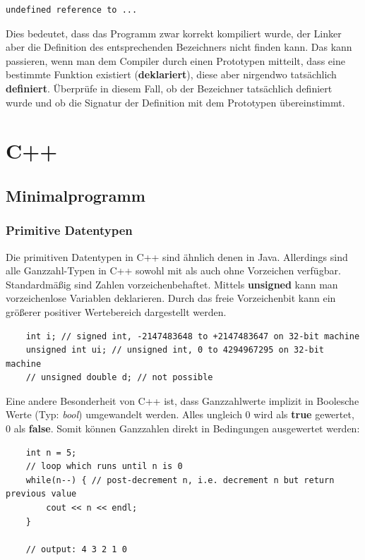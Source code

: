 \documentclass[
  accentcolor=tud1c,	%
  colorbacktitle,		%
  inverttitle,			%
  german,
  twoside
]{tudreport}
\begin{document}
\begin{verbatim}
undefined reference to ...
\end{verbatim}

Dies bedeutet, dass das Programm zwar korrekt kompiliert wurde, der Linker aber die Definition des entsprechenden Bezeichners nicht finden kann.
Das kann passieren, wenn man dem Compiler durch einen Prototypen mitteilt, dass eine bestimmte Funktion existiert (\textbf{deklariert}), diese aber nirgendwo tatsächlich \textbf{definiert}.
Überprüfe in diesem Fall, ob der Bezeichner tatsächlich definiert wurde und ob die Signatur der Definition mit dem Prototypen übereinstimmt.



\chapter{C++}
\section{Minimalprogramm}


\subsection{Primitive Datentypen}
Die primitiven Datentypen in C++ sind ähnlich denen in Java.
Allerdings sind alle Ganzzahl-Typen in C++ sowohl mit als auch ohne Vorzeichen verfügbar.
Standardmäßig sind Zahlen vorzeichenbehaftet.
Mittels \textbf{unsigned} kann man vorzeichenlose Variablen deklarieren.
Durch das freie Vorzeichenbit kann ein größerer positiver Wertebereich dargestellt werden.

\begin{lstlisting}
 	int i; // signed int, -2147483648 to +2147483647 on 32-bit machine
	unsigned int ui; // unsigned int, 0 to 4294967295 on 32-bit machine
	// unsigned double d; // not possible
\end{lstlisting}

Eine andere Besonderheit von C++ ist, dass Ganzzahlwerte implizit in Boolesche Werte (Typ: \emph{bool}) umgewandelt werden.
Alles ungleich 0 wird als \textbf{true} gewertet, 0 als \textbf{false}.
Somit können Ganzzahlen direkt in Bedingungen ausgewertet werden:

\begin{lstlisting}
 	int n = 5;
 	// loop which runs until n is 0
 	while(n--) { // post-decrement n, i.e. decrement n but return previous value
  		cout << n << endl;
 	}

	// output: 4 3 2 1 0
\end{lstlisting}
\end{document}
